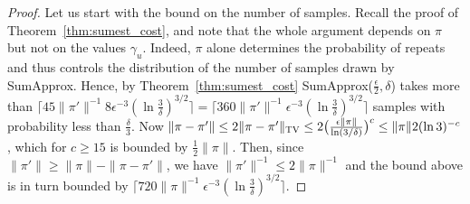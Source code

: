 \documentclass[a4paper,11pt]{article}
\newcommand{\tvd}[2]{\| {#1 - #2} \|_\textsc{TV}}
\newcommand{\sumest}{SumApprox}
\begin{document}
\begin{proof}
Let us start with the bound on the number of samples.
Recall the proof of Theorem~\ref{thm:sumest_cost}, and note that the whole argument depends on $\pi$ but not on the values $\gamma_u$.
Indeed, $\pi$ alone determines the probability of repeats and thus controls the distribution of the number of samples drawn by \sumest.
Hence, by Theorem~\ref{thm:sumest_cost} \sumest($\frac{\epsilon}{2},\delta$) takes more than $\lceil 45 \|\pi'\|^{-1} 8 \epsilon^{-3}(\ln{\frac{3}{\delta}})^{3/2} \rceil = \lceil 360 \|\pi'\|^{-1} \epsilon^{-3}(\ln{\frac{3}{\delta}})^{3/2} \rceil$ samples with probability less than $\frac{\delta}{3}$.
Now $\|\pi - \pi'\| \le 2\tvd{\pi}{\pi'} \le 2\big(\frac{\epsilon \|\pi\|}{\ln(3/\delta)}\big)^c \le \|\pi\| 2(\ln{3})^{-c}$, which for $c \ge 15$ is bounded by $\frac{1}{2} \|\pi\|$.
Then, since $\|\pi'\| \ge \|\pi\| - \|\pi - \pi'\|$, we have $\|\pi'\|^{-1} \le 2 \|\pi\|^{-1}$ and the bound above is in turn bounded by $\lceil 720 \|\pi\|^{-1} \epsilon^{-3}(\ln{\frac{3}{\delta}})^{3/2} \rceil$.


\end{proof}
\end{document}
